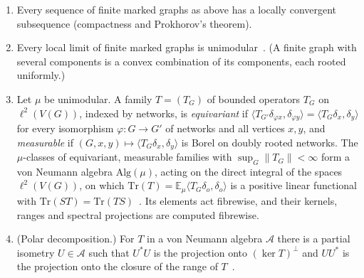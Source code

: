 \begin{enumerate}[label=(L\arabic*)]
\item Every sequence of finite marked graphs as above has a locally convergent subsequence (compactness and
  Prokhorov's theorem).
\item Every local limit of finite marked graphs is unimodular~\cite[Section~2]{AldousLyons2007}. (A finite graph with
  several components is a convex combination of its components, each rooted uniformly.)
\item Let $\mu$ be unimodular. A family $T=(T_G)$ of bounded operators $T_G$ on $\ell^2(V(G))$, indexed by networks,
  is \emph{equivariant} if $\langle T_{G'}\delta_{\varphi x},\delta_{\varphi y}\rangle=\langle T_G\delta_x,\delta_y\rangle$
  for every isomorphism $\varphi\colon G\to G'$ of networks and all vertices $x,y$, and \emph{measurable} if
  $(G,x,y)\mapsto\langle T_G\delta_x,\delta_y\rangle$ is Borel on doubly rooted networks. The $\mu$-classes of
  equivariant, measurable families with $\sup_G\lVert T_G\rVert<\infty$ form a von Neumann algebra $\mathrm{Alg}(\mu)$,
  acting on the direct integral of the spaces $\ell^2(V(G))$, on which
  $\mathrm{Tr}(T)=\mathbb{E}_\mu\langle T_G\delta_o,\delta_o\rangle$ is a positive linear functional with
  $\mathrm{Tr}(ST)=\mathrm{Tr}(TS)$~\cite[Section~5]{AldousLyons2007}. Its elements act fibrewise, and their kernels,
  ranges and spectral projections are computed fibrewise.
\item (Polar decomposition.) For $T$ in a von Neumann algebra $\mathcal A$ there is a partial isometry $U\in\mathcal A$
  such that $U^*U$ is the projection onto $(\ker T)^\perp$ and $UU^*$ is the projection onto the closure of the range
  of $T$~\cite[Theorem~6.1.2 and Proposition~6.1.3]{KadisonRingrose1997}.
\end{enumerate}


